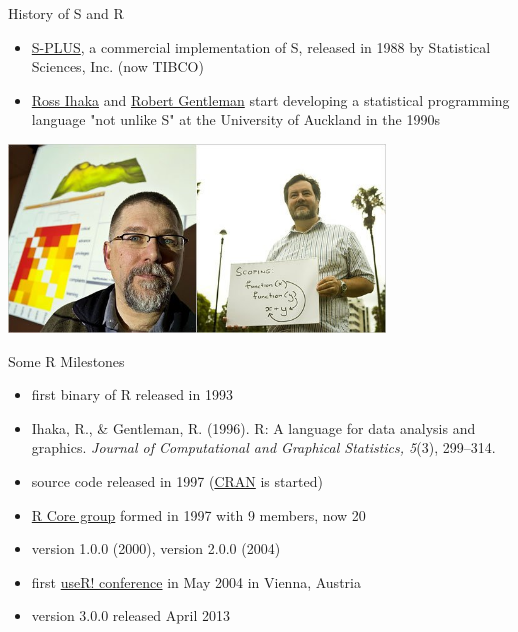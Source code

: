 \documentclass[t,12pt]{beamer}
\begin{document}
\begin{frame}{History of S and R}

\begin{itemize}
   \item \href{http://en.wikipedia.org/wiki/S-plus}{S-PLUS}, a commercial implementation of S, released in 1988 by Statistical Sciences, Inc. (now TIBCO)
   \item \href{http://en.wikipedia.org/wiki/Ross_Ihaka}{Ross Ihaka} and \href{http://en.wikipedia.org/wiki/Robert_Gentleman_(statistician)}{Robert Gentleman} start developing a statistical programming language "not unlike S" at the University of Auckland in the 1990s
\end{itemize}

\begin{center}
\includegraphics[width=0.75\textwidth]{ihaka_gentleman.jpg}
\end{center}

\end{frame}


\begin{frame}{Some R Milestones}

\begin{itemize}
   \item first binary of R released in 1993
   \item Ihaka, R., \& Gentleman, R. (1996). R: A language for data analysis and graphics. \textit{Journal of Computational and Graphical Statistics, 5}(3), 299--314.
   \item source code released in 1997 (\href{https://cran.r-project.org/}{CRAN} is started)
   \item \href{http://www.r-project.org/contributors.html}{R Core group} formed in 1997 with 9 members, now 20
   \item version 1.0.0 (2000), version 2.0.0 (2004)
   \item first \href{http://www.r-project.org/conferences.html}{useR! conference} in May 2004 in Vienna, Austria
   \item version 3.0.0 released April 2013
\end{itemize}

\end{frame}
\end{document}
